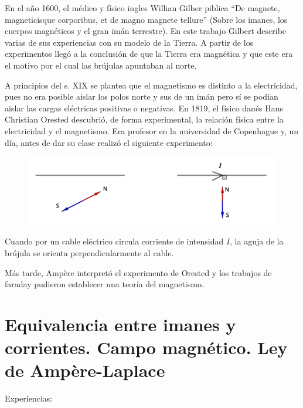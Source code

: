 En el año 1600, el médico y físico ingles Willian Gilber piblica
``De magnete, magneticisque corporibus, et de magno magnete tellure'' (Sobre los imanes, los cuerpos magnéticos y el gran imán terrestre). En este trabajo Gilbert describe varias de sus experiencias con su modelo de la Tierra. A partir de los experimentos llegó a la conclusión de que la Tierra era magnética y que este era el motivo por el cual las brújulas apuntaban al norte.

A principios del s. XIX se plantea que el magnetismo es distinto a la electricidad, pues no era posible aislar los polos norte y sus de un imán pero sí se podían aislar las cargas eléctricas positivas o negativas. En 1819, el físico danés Hans Christian Orested  descubrió, de forma experimental, la relación física entre la electricidad y el magnetismo. Era profesor en la universidad de Copenhague y, un día, antes de dar su clase realizó el siguiente experimento:

\begin{figure}[H]
	\centering
	\includegraphics[width=.9\textwidth]{imagenes/imagenes26/T26IM01.png}
\end{figure}

Cuando por un cable eléctrico circula corriente de intensidad $I$, la aguja de la brújula se orienta perpendicularmente al cable.

Más tarde, Ampère interpretó el experimento de Orested y los trabajos de faraday pudieron establecer una teoría del magnetismo.

\section[Equivalencia entre imanes y corrientes. Campo magnético. Ley de Ampère-Laplace]{Equivalencia entre imanes y corrientes. Campo magnético. Ley de Ampère-Laplace}
Experiencias:

